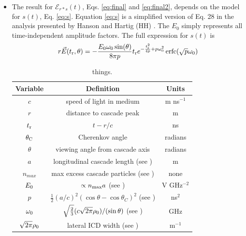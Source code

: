 \documentclass[amsmath,amssymb,aps,prd,10pt,twocolumn,showkeys]{revtex4}
\DeclareMathOperator\erfc{erfc}
\begin{document}
\begin{itemize}
\item The result for $\mathcal{E}_{r*s}(t)$, Eqs. \ref{eq:final} and \ref{eq:final2}, depends on the model for $s(t)$, Eq. \ref{eq:s}.  Equation \ref{eq:s} is a simplified version of Eq. 28 in the analysis presented by Hanson and Hartig (HH) \cite{PhysRevD.105.123019}.  The $E_0$ simply represents all time-independent amplitude factors.  The full expression for $s(t)$ is
\begin{equation}
r\vec{E}(t_{\rm r},\theta) = -\frac{E_0\omega_0 \sin(\theta)}{8\pi p}t_{\rm r}e^{-\frac{t_{\rm r}^2}{4p}+p\omega_0^2}\erfc(\sqrt{p}\omega_0) \label{eq:s_full}
\end{equation}
\begin{table}
\begin{tabular}{| c | c | c |} \hline
\textbf{Variable} & \textbf{Definition} & \textbf{Units}\\ \hline
$c$ & speed of light in medium & m ns$^{-1}$ \\ 
$r$ & distance to cascade peak & m \\
$t_{\rm r}$ & $t-r/c$ & ns \\
$\theta_{\rm C}$ & Cherenkov angle & radians \\ 
$\theta$ & viewing angle from cascade axis & radians \\ 
$a$ & longitudinal cascade length (see \cite{10.1103/physrevd.65.016003}) & m \\ 
$n_{max}$ & max excess cascade particles (see \cite{10.1103/physrevd.65.016003})  & none \\
$E_{\rm 0}$ & $\propto n_{\rm max}a$ (see \cite{10.1103/physrevd.65.016003}) & V GHz$^{-2}$ \\
$p$ & $\frac{1}{2}(a/c)^2 \left(\cos\theta - \cos\theta_C\right)^2$ (see \cite{PhysRevD.105.123019}) & ns$^2$ \\ 
$\omega_{\rm 0}$ & $\sqrt{\frac{2}{3}} (c\sqrt{2\pi}\rho_{\rm 0})/(\sin\theta)$ (see \cite{10.1016/j.astropartphys.2017.03.008}) & GHz \\
$\sqrt{2\pi}\rho_{\rm 0}$ & lateral ICD width (see \cite{10.1016/j.astropartphys.2017.03.008}) & m$^{-1}$ \\ \hline
\end{tabular}
\caption{\label{tab:param} things.}
\end{table}


\end{itemize}
\end{document}
